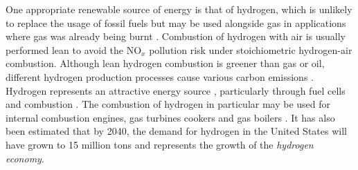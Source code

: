 One appropriate renewable source of energy is that of hydrogen, which is unlikely to replace the usage of fossil fuels but may be used alongside gas in applications where gas was already being burnt \cite{momirlan2005PropertiesHydrogenFuel}. Combustion of hydrogen with air is usually performed lean to avoid the NO$_x$ pollution risk under stoichiometric hydrogen-air combustion. Although lean hydrogen combustion is greener than gas or oil, different hydrogen production processes \cite{dasilvaveras2017HydrogenTrendsProduction} cause various carbon emissions \cite{nationalgrid2022HeatingOurHomes}. Hydrogen represents an attractive energy source \cite{momirlan2005PropertiesHydrogenFuel}, particularly through fuel cells \cite{momirlan2005PropertiesHydrogenFuel} and combustion \cite{lanz2001Module3Hydrogen, stepien2021ComprehensiveOverviewHydrogenFueled}. The combustion of hydrogen in particular may be used for internal combustion engines, gas turbines cookers and gas boilers \cite{momirlan2005PropertiesHydrogenFuel}. It has also been estimated that by 2040, the demand for hydrogen in the United States will have grown to 15 million tons \cite{molkov2007HydrogenSafetyResearch} and represents the growth of the \emph{hydrogen economy}.

